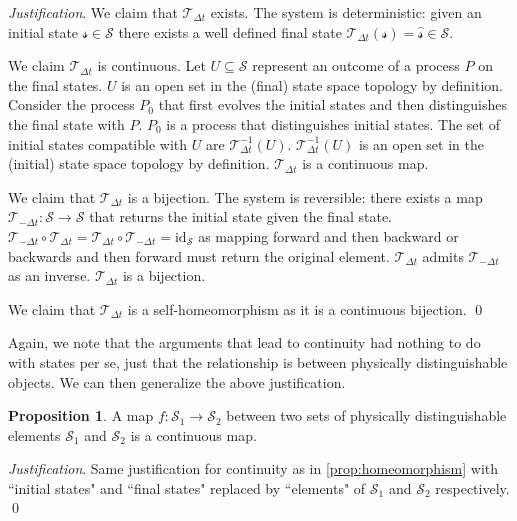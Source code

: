 \documentclass[aps,pra,10pt,twocolumn,floatfix,nofootinbib]{revtex4-1}
\numberwithin{equation}{section}
\theoremstyle{definition}
\newtheorem{prop}[equation]{Proposition}
\newenvironment{justification}{\emph{Justification}.}{\qed}
\newcommand{\id}{\textrm{id}}
\begin{document}
\begin{justification}
We claim that $\mathcal{T}_{\Delta t}$ exists. The system is deterministic: given an initial state $\mathcal{s} \in \mathcal{S}$ there exists a well defined final state $\mathcal{T}_{\Delta t}(\mathcal{s})=\hat{\mathcal{s}} \in \mathcal{S}$.

We claim $\mathcal{T}_{\Delta t}$ is continuous. Let $U \subseteq \mathcal{S}$ represent an outcome of a process $P$ on the final states. $U$ is an open set in the (final) state space topology by definition. Consider the process $P_0$ that first evolves the initial states and then distinguishes the final state with $P$. $P_0$ is a process that distinguishes initial states. The set of initial states compatible with $U$ are $\mathcal{T}_{\Delta t}^{-1}(U)$. $\mathcal{T}_{\Delta t}^{-1}(U)$ is an open set in the (initial) state space topology by definition. $\mathcal{T}_{\Delta t}$ is a continuous map.

We claim that $\mathcal{T}_{\Delta t}$ is a bijection. The system is reversible: there exists a map $\mathcal{T}_{-\Delta t}:\mathcal{S} \rightarrow \mathcal{S}$ that returns the initial state given the final state. $\mathcal{T}_{-\Delta t} \circ \mathcal{T}_{\Delta t} = \mathcal{T}_{\Delta t} \circ \mathcal{T}_{-\Delta t} = \id_{\mathcal{S}}$ as mapping forward and then backward or backwards and then forward must return the original element. $\mathcal{T}_{\Delta t}$ admits $\mathcal{T}_{-\Delta t}$ as an inverse. $\mathcal{T}_{\Delta t}$ is a bijection.

We claim that $\mathcal{T}_{\Delta t}$ is a self-homeomorphism as it is a continuous bijection.
\end{justification}

Again, we note that the arguments that lead to continuity had nothing to do with states per se, just that the relationship is between physically distinguishable objects. We can then generalize the above justification.

\begin{prop}\label{prop:continuity}
	A map $f:\mathcal{S_1} \rightarrow \mathcal{S_2}$ between two sets of physically distinguishable elements $\mathcal{S_1}$ and $\mathcal{S_2}$ is a continuous map.
\end{prop}

\begin{justification}
	Same justification for continuity as in \ref{prop:homeomorphism} with ``initial states" and ``final states" replaced by ``elements" of $\mathcal{S_1}$ and $\mathcal{S_2}$ respectively.
\end{justification}
\end{document}
